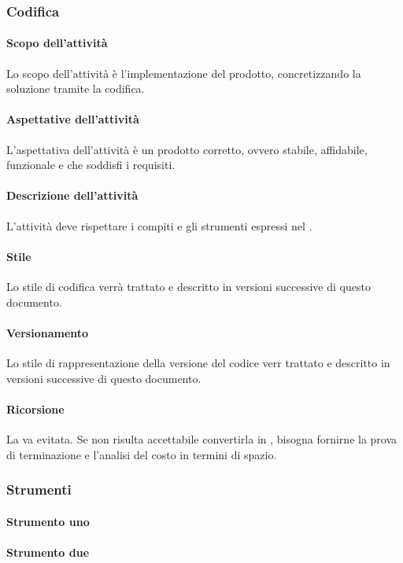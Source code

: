 \subsubsection{Codifica}
 \paragraph{Scopo dell'attività}
 Lo scopo dell'attività è l'implementazione del prodotto, concretizzando la soluzione tramite la codifica.  
 \paragraph{Aspettative dell'attività}
 L'aspettativa dell'attività è un prodotto corretto, ovvero stabile, affidabile, funzionale e che soddisfi i requisiti. 
 \paragraph{Descrizione dell'attività}
 L'attività deve rispettare i compiti e gli strumenti espressi nel \PPdocRR.
 \paragraph{Stile}
 Lo stile di codifica verrà trattato e descritto in versioni successive di questo documento.
 \paragraph{Versionamento}
 Lo stile di rappresentazione della versione del codice verr trattato e descritto in versioni successive di questo documento.
 \paragraph{Ricorsione}
 La  va evitata. Se non risulta accettabile convertirla in , bisogna fornirne la prova di terminazione e l'analisi del costo in termini di spazio.
\subsubsection{Strumenti}
  \paragraph{Strumento uno}

 \paragraph{Strumento due}



  
